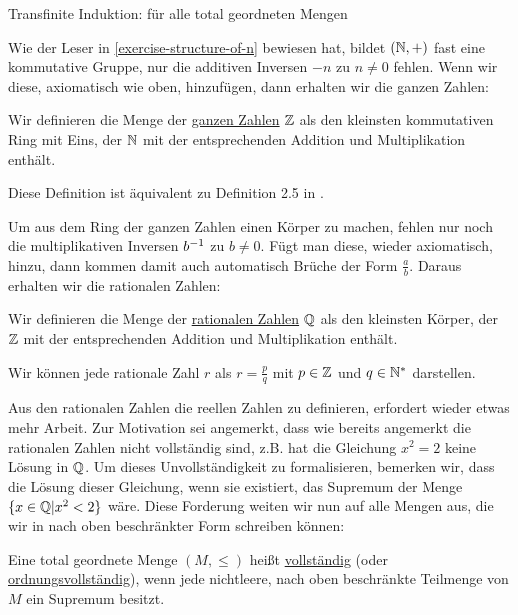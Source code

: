 \begin{remark}
    \label{remark-transfinite-induction}
    Transfinite Induktion: für alle total geordneten Mengen
\end{remark}

Wie der Leser in \ref{exercise-structure-of-n} bewiesen hat, bildet $(\mathbb{N}, +)$ fast eine kommutative Gruppe, nur die additiven Inversen $-n$ zu $n \neq 0$ fehlen. Wenn wir diese, axiomatisch wie oben, hinzufügen, dann erhalten wir die ganzen Zahlen:

\begin{definition}
    Wir definieren die Menge der \underline{ganzen Zahlen} $\mathbb{Z}$ als den kleinsten kommutativen Ring mit Eins, der $\mathbb{N}$ mit der entsprechenden Addition und Multiplikation enthält.
\end{definition}

Diese Definition ist äquivalent zu Definition 2.5 in \cite{GURAU}.

Um aus dem Ring der ganzen Zahlen einen Körper zu machen, fehlen nur noch die multiplikativen Inversen $b^{-1}$ zu $b \neq 0$. Fügt man diese, wieder axiomatisch, hinzu, dann kommen damit auch automatisch Brüche der Form $\frac{a}{b}$. Daraus erhalten wir die rationalen Zahlen:

\begin{definition}
    Wir definieren die Menge der \underline{rationalen Zahlen} $\mathbb{Q}$ als den kleinsten Körper, der $\mathbb{Z}$ mit der entsprechenden Addition und Multiplikation enthält.
\end{definition}

\begin{remark}
    Wir können jede rationale Zahl $r$ als $r = \frac{p}{q}$ mit $p \in \mathbb{Z}$ und $q \in \mathbb{N}^*$ darstellen.
\end{remark}

Aus den rationalen Zahlen die reellen Zahlen zu definieren, erfordert wieder etwas mehr Arbeit. Zur Motivation sei angemerkt, dass wie bereits angemerkt die rationalen Zahlen nicht vollständig sind, z.B. hat die Gleichung $x^2 = 2$ keine Lösung in $\mathbb{Q}$. Um dieses Unvollständigkeit zu formalisieren, bemerken wir, dass die Lösung dieser Gleichung, wenn sie existiert, das Supremum der Menge $\{x \in \mathbb{Q} | x^2 < 2\}$ wäre. Diese Forderung weiten wir nun auf alle Mengen aus, die wir in nach oben beschränkter Form schreiben können:

\begin{definition}[vollständig]
    Eine total geordnete Menge $(M, \leq)$ heißt \underline{vollständig} (oder \underline{ordnungsvollständig}), wenn jede nichtleere, nach oben beschränkte Teilmenge von $M$ ein Supremum besitzt.
\end{definition}

